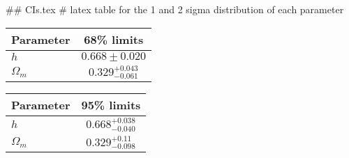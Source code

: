 ## CIs.tex
# latex table for the 1 and 2 sigma distribution of each parameter

\begin{tabular} { l  c}
 Parameter &  68\% limits\\
\hline
{\boldmath$h              $} & $0.668\pm 0.020            $\\
{\boldmath$\Omega_m       $} & $0.329^{+0.043}_{-0.061}   $\\
\hline
\end{tabular}

\begin{tabular} { l  c}
 Parameter &  95\% limits\\
\hline
{\boldmath$h              $} & $0.668^{+0.038}_{-0.040}   $\\
{\boldmath$\Omega_m       $} & $0.329^{+0.11}_{-0.098}    $\\
\hline
\end{tabular}
